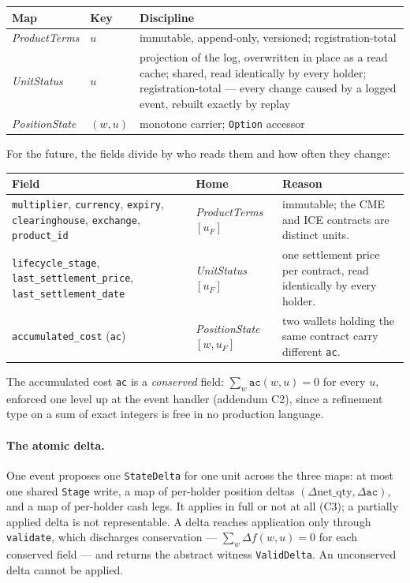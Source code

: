 \documentclass[11pt]{article}
\newcommand{\ac}{\texttt{ac}}
\newcommand{\netq}{\mathrm{net\_qty}}
\newcommand{\code}[1]{\texttt{#1}}
\newcommand{\unit}{u_{F}}
\begin{document}
\begin{center}\small
\begin{tabular}{@{}llp{10.4cm}@{}}
\toprule
Map & Key & Discipline \\
\midrule
\emph{ProductTerms}  & $u$            & immutable, append-only, versioned; registration-total \\
\emph{UnitStatus}    & $u$            & projection of the log, overwritten in place as a read cache; shared, read identically by every holder; registration-total --- every change caused by a logged event, rebuilt exactly by replay \\
\emph{PositionState} & $(w,u)$        & monotone carrier; \code{Option} accessor \\
\bottomrule
\end{tabular}
\end{center}
\label{sec:answer-recalled}

\noindent For the future, the fields divide by who reads them and how often they change:

\begin{center}\small
\begin{tabular}{@{}p{6.6cm}p{3.0cm}p{5.4cm}@{}}
\toprule
Field & Home & Reason \\
\midrule
\code{multiplier}, \code{currency}, \code{expiry}, \code{clearinghouse}, \code{exchange},
\code{product\_id} & \emph{ProductTerms}$[\unit]$ & immutable; the CME and ICE contracts are
distinct units. \\
\addlinespace
\code{lifecycle\_stage}, \code{last\_settlement\_price}, \code{last\_settlement\_date} &
\emph{UnitStatus}$[\unit]$ & one settlement price per contract, read identically by every holder. \\
\addlinespace
\code{accumulated\_cost} (\ac) & \emph{PositionState}$[w,\unit]$ & two wallets holding the same
contract carry different \ac. \\
\bottomrule
\end{tabular}
\end{center}

\noindent The accumulated cost \ac{} is a \emph{conserved} field: $\sum_w \ac(w,u)=0$ for every $u$,
enforced one level up at the event handler (addendum C2), since a refinement type on a sum of exact
integers is free in no production language.

\paragraph{The atomic delta.} One event proposes one \code{StateDelta} for one unit across the three
maps: at most one shared \code{Stage} write, a map of per-holder position deltas
$(\Delta\netq,\Delta\ac)$, and a map of per-holder cash legs. It applies in full or not at all
(C3); a partially applied delta is not representable. A delta reaches application only through
\code{validate}, which discharges conservation --- $\sum_w\Delta f(w,u)=0$ for each conserved field
--- and returns the abstract witness \code{ValidDelta}. An unconserved delta cannot be applied.
\end{document}
